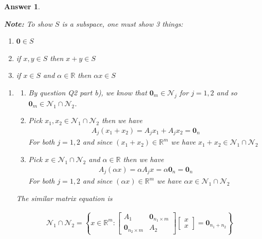 \documentclass[12pt]{article}
\theoremstyle{colon}
\newtheorem*{answer}{Answer}
\begin{document}
\begin{answer}
  \
  
  \textbf{Note: } To show $S$ is a subspace, one must show 3 things:
  \begin{enumerate}[label=\roman*)]
    \item $\bm{0} \in S$
    \item if $x, y \in S$ then $x + y \in S$
    \item if $x \in S$ and $\alpha \in \mathbb{R}$ then $\alpha x \in S$
  \end{enumerate}

  \begin{enumerate}[label=\alph*)]
    \item 
      \begin{enumerate}[label=\roman*)]

        \item By question Q2  part b), we know that $\bm{0}_m \in \mathcal{N}_j$ for $j = 1, 2$ and so $\bm{0}_m \in \mathcal{N}_1 \cap \mathcal{N}_2$.

        \item Pick $x_1, x_2 \in \mathcal{N}_1 \cap \mathcal{N}_2$ then we have
          \begin{gather*}
            A_j (x_1 + x_2) = A_j x_1 + A_j x_2 = \bm{0}_n
          \end{gather*}
          For both $j = 1, 2 $ and since $(x_1 + x_2) \in \mathbb{R}^m$ we have $x_1 + x_2 \in \mathcal{N}_1 \cap \mathcal{N}_2$

        \item Pick $x \in \mathcal{N}_1 \cap \mathcal{N}_2$ and $\alpha \in \mathbb{R}$ then we have
          \begin{gather*}
            A_j (\alpha x) = \alpha A_j x = \alpha \bm{0}_n = \bm{0}_n
          \end{gather*}
          For both $j = 1, 2 $ and since $(\alpha x) \in \mathbb{R}^m$ we have $\alpha x \in \mathcal{N}_1 \cap \mathcal{N}_2$
      \end{enumerate}

      The similar matrix equation is 
      
      \begin{gather*}
        \mathcal{N}_1 \cap \mathcal{N}_2 = \left\{ x \in \mathbb{R}^m: \begin{bmatrix} A_1 & \bm{0}_{n_1 \times m} \\ \bm{0}_{n_2 \times m} & A_2\end{bmatrix} \begin{bmatrix} x \\ x \end{bmatrix} = \bm{0}_{n_1 + n_2} \right\}
      \end{gather*}


\end{enumerate}
\end{answer}
\end{document}
